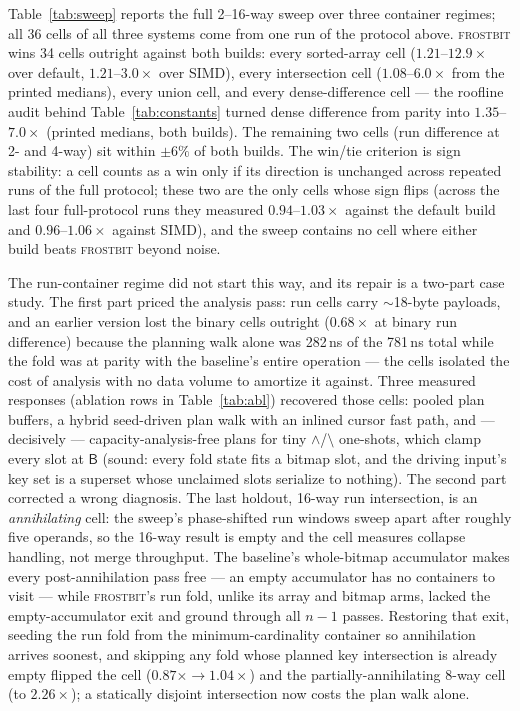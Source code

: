 \documentclass[sigconf,nonacm]{acmart}
\newcommand{\fb}{\textsc{frostbit}}
\newcommand{\B}{\ensuremath{\mathsf{B}}}
\begin{document}
Table~\ref{tab:sweep} reports the full 2--16-way sweep over three
container regimes; all 36 cells of all three systems come from one
run of the protocol above. \fb{} wins 34 cells outright against both
builds: every sorted-array cell ($1.21$--$12.9\times$ over default,
$1.21$--$3.0\times$ over SIMD), every intersection cell
($1.08$--$6.0\times$ from the printed medians), every union cell, and every dense-difference
cell --- the roofline audit behind Table~\ref{tab:constants} turned
dense difference from parity into $1.35$--$7.0\times$ (printed medians, both builds). The remaining
two cells (run difference at 2- and 4-way) sit within $\pm 6\%$ of
both builds. The win/tie criterion is sign stability: a cell counts as
a win only if its direction is unchanged across repeated runs of the
full protocol; these two are the only cells whose sign flips (across
the last four full-protocol runs they measured $0.94$--$1.03\times$
against the default build and $0.96$--$1.06\times$ against SIMD), and
the sweep contains no cell where either build beats \fb{} beyond
noise.

The run-container regime did not start this way, and its repair is a
two-part case study. The first part priced the analysis pass: run
cells carry $\sim$18-byte payloads, and an earlier version lost the
binary cells outright ($0.68\times$ at binary run difference) because
the planning walk alone was 282\,ns of the 781\,ns total while the
fold was at parity with the baseline's entire operation --- the cells
isolated the cost of analysis with no data volume to amortize it
against. Three measured responses (ablation rows in
Table~\ref{tab:abl}) recovered those cells: pooled plan buffers, a
hybrid seed-driven plan walk with an inlined cursor fast path, and ---
decisively --- capacity-analysis-free plans for tiny
$\wedge$/$\setminus$ one-shots, which clamp every slot at $\B$ (sound:
every fold state fits a bitmap slot, and the driving input's key set
is a superset whose unclaimed slots serialize to nothing). The second
part corrected a wrong diagnosis. The last holdout, 16-way run
intersection, is an \emph{annihilating} cell: the sweep's
phase-shifted run windows sweep apart after roughly five operands, so
the 16-way result is empty and the cell measures collapse handling,
not merge throughput. The baseline's whole-bitmap accumulator makes
every post-annihilation pass free --- an empty accumulator has no
containers to visit --- while \fb's run fold, unlike its array and
bitmap arms, lacked the empty-accumulator exit and ground through all
$n{-}1$ passes. Restoring that exit, seeding the run fold from the
minimum-cardinality container so annihilation arrives soonest, and
skipping any fold whose planned key intersection is already empty
flipped the cell ($0.87\times \to 1.04\times$) and the
partially-annihilating 8-way cell (to $2.26\times$); a statically
disjoint intersection now costs the plan walk alone.
\end{document}
